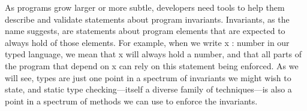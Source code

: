 \secdown

As programs grow larger or more subtle, developers need tools to help them
describe and validate statements about program invariants. Invariants, as the
name suggests, are statements about program elements that are expected to always
hold of those elements. For example, when we write x : number in our typed
language, we mean that x will always hold a number, and that all parts of the
program that depend on x can rely on this statement being enforced. As we will
see, types are just one point in a spectrum of invariants we might wish to
state, and static type checking—itself a diverse family of techniques—is also a
point in a spectrum of methods we can use to enforce the invariants.




\secup
